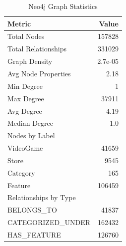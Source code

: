 \documentclass{article}
\begin{document}
\begin{table}[h]
    \centering
    \begin{tabular}{|l|r|}
        \hline
        \textbf{Metric}             & \textbf{Value} \\ \hline
        Total Nodes                 & 157828         \\
        Total Relationships         & 331029         \\
        Graph Density               & 2.7e-05        \\
        Avg Node Properties         & 2.18           \\
        Min Degree                  & 1              \\
        Max Degree                  & 37911          \\
        Avg Degree                  & 4.19           \\
        Median Degree               & 1.0            \\
        \hline
        Nodes by Label              &                \\
        \quad VideoGame             & 41659          \\
        \quad Store                 & 9545           \\
        \quad Category              & 165            \\
        \quad Feature               & 106459         \\
        \hline
        Relationships by Type       &                \\
        \quad BELONGS\_TO            & 41837          \\
        \quad CATEGORIZED\_UNDER     & 162432         \\
        \quad HAS\_FEATURE           & 126760         \\
        \hline
    \end{tabular}
    \caption{Neo4j Graph Statistics}
    \label{tab:neo4j-stats}
\end{table}

\end{document}
